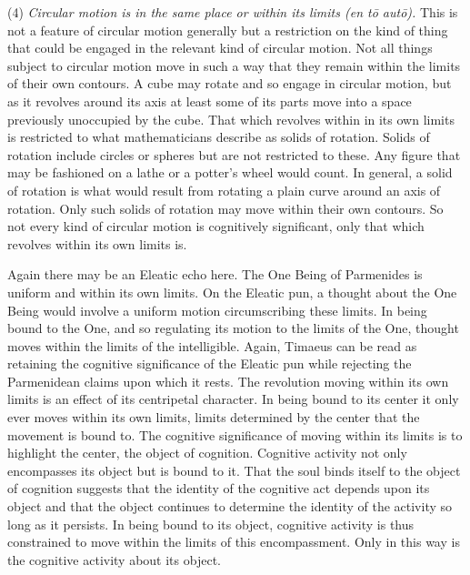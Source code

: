 (4) \emph{Circular motion is in the same place or within its limits (\emph{en tō autō}).} This is not a feature of circular motion generally but a restriction on the kind of thing that could be engaged in the relevant kind of circular motion. Not all things subject to circular motion move in such a way that they remain within the limits of their own contours. A cube may rotate and so engage in circular motion, but as it revolves around its axis at least some of its parts move into a space previously unoccupied by the cube. That which revolves within in its own limits is restricted to what mathematicians describe as solids of rotation. Solids of rotation include circles or spheres but are not restricted to these. Any figure that may be fashioned on a lathe or a potter's wheel would count. In general, a solid of rotation is what would result from rotating a plain curve around an axis of rotation. Only such solids of rotation may move within their own contours. So not every kind of circular motion is cognitively significant, only that which revolves within its own limits is.

Again there may be an Eleatic echo here. The One Being of Parmenides is uniform and within its own limits. On the Eleatic pun, a thought about the One Being would involve a uniform motion circumscribing these limits. In being bound to the One, and so regulating its motion to the limits of the One, thought moves within the limits of the intelligible. Again, Timaeus can be read as retaining the cognitive significance of the Eleatic pun while rejecting the Parmenidean claims upon which it rests. The revolution moving within its own limits is an effect of its centripetal character. In being bound to its center it only ever moves within its own limits, limits determined by the center that the movement is bound to. The cognitive significance of moving within its limits is to highlight the center, the object of cognition. Cognitive activity not only encompasses its object but is bound to it. That the soul binds itself to the object of cognition suggests that the identity of the cognitive act depends upon its object and that the object continues to determine the identity of the activity so long as it persists. In being bound to its object, cognitive activity is thus constrained to move within the limits of this encompassment. Only in this way is the cognitive activity about its object.

